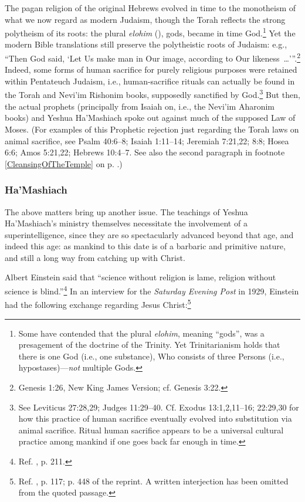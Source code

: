 \documentclass[letterpaper,12pt]{article}
\newcounter{AnimalSacrificesZ}
\begin{document}
The pagan religion of the original Hebrews evolved in time to the monotheism of what we now regard as modern Judaism, though the Torah reflects the strong polytheism of its roots: the plural \emph{elohim} (), gods, became in time God.\footnote{Some have contended that the plural \emph{elohim}, meaning ``gods'', was a presagement of the doctrine of the Trinity. Yet Trinitarianism holds that there is one God (i.e., one substance), Who consists of three Persons (i.e., hypostases)---\emph{not} multiple Gods.} Yet the modern Bible translations still preserve the polytheistic roots of Judaism: e.g., ``Then God said, `Let Us make man in Our image, according to Our likeness~\ldots'\thinspace''.\footnote{Genesis 1:26, New King James Version; cf. Genesis 3:22.} Indeed, some forms of human sacrifice for purely religious purposes were retained within Pentateuch Judaism, i.e., human-sacrifice rituals can actually be found in the Torah and Nevi'im Rishonim books, supposedly sanctified by God.\footnote{See Leviticus 27:28,29; Judges 11:29--40. Cf. Exodus 13:1,2,11--16; 22:29,30 for how this practice of human sacrifice eventually evolved into substitution via animal sacrifice. Ritual human sacrifice appears to be a universal cultural practice among mankind if one goes back far enough in time.} But then, the actual prophets (principally from Isaiah on, i.e., the Nevi'im Aharonim books) and Yeshua Ha'Mashiach spoke out against much of the supposed Law of Moses. (For\label{AnimalSacrifices} examples of this Prophetic rejection just regarding the Torah laws on animal sacrifice, see Psalm 40:6--8; Isaiah 1:11--14; Jeremiah 7:21,22; 8:8; Hosea 6:6; Amos 5:21,22; Hebrews 10:4--7. See also the second paragraph in footnote \ref{CleansingOfTheTemple} on p. \pageref{CleansingOfTheTemple}.)

\subsubsection{Ha'Mashiach}
\label{subsubsec:HaMashiach}

The above matters bring up another issue. The teachings of Yeshua Ha'Mashiach's ministry themselves necessitate the involvement of a superintelligence, since they are so spectacularly advanced beyond that age, and indeed this age: as mankind to this date is of a barbaric and primitive nature, and still a long way from catching up with Christ.

Albert Einstein said that ``science without religion is lame, religion without science is blind.''\footnote{Ref. , p. 211.} In an interview for the \emph{Saturday Evening Post} in 1929, Einstein had the following exchange regarding Jesus Christ:\footnote{Ref. , p. 117; p. 448 of the reprint. A written interjection has been omitted from the quoted passage.}
\end{document}
